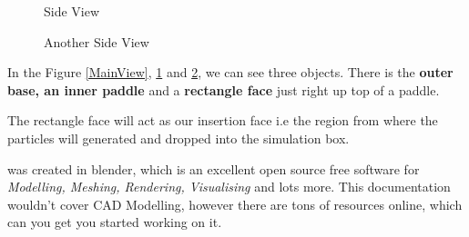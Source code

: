 \documentclass{tufte-book} %
\begin{document}
\begin{figure}
  
  \caption{Side View}
  \label{SideView}
\end{figure}\begin{figure}
  
  \caption{Another Side View}
  \label{Side2View}
\end{figure}

In the Figure \ref{MainView}, \ref{SideView} and \ref{Side2View}, we can see three objects.
There is the \textbf{outer base, an inner paddle} and a \textbf{rectangle face} just right up top of a paddle.

The rectangle face will act as our insertion face i.e the region from where the particles will generated and dropped into the simulation box.

 was created in blender, which is an excellent open source free software for \textit{Modelling, Meshing, Rendering, Visualising} and lots more. This documentation wouldn't cover CAD Modelling, however there are tons of resources online, which can you get you started working on it.
\end{document}
